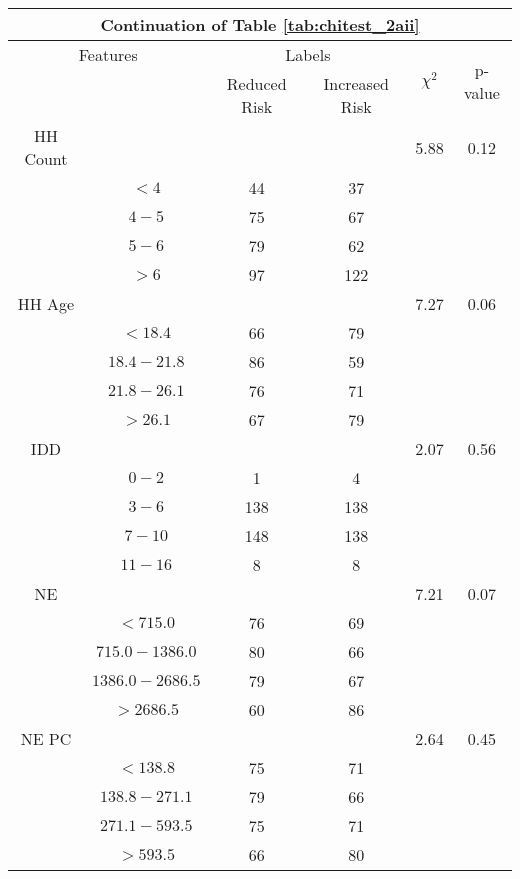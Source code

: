 \begin{table}
\centering
\label{tab:chitest_2aii_cont}
\begin{tabular}{c c | c c| c | c}
\hline
\multicolumn{6}{c}{Continuation of Table \ref{tab:chitest_2aii}}\\ 
\hline
\multicolumn{2}{c|}{Features}& \multicolumn{2}{c|}{Labels}& \multirow{2}{*}{$\chi^2$} & \multirow{2}{*}{p-value}\\ 
& & Reduced Risk & Increased Risk & & \\ 
\hline
HH Count &  &  & & 5.88 & 0.12 \\ 
& $< 4$ & 44 & 37& & \\ 
& $4-5$ & 75 & 67& & \\ 
& $5-6$ & 79 & 62& & \\ 
& $> 6$ & 97 & 122& & \\ 
\hline 
HH Age &  &  & & 7.27 & 0.06 \\ 
& $< 18.4$ & 66 & 79& & \\ 
& $18.4-21.8$ & 86 & 59& & \\ 
& $21.8-26.1$ & 76 & 71& & \\ 
& $> 26.1$ & 67 & 79& & \\ 
\hline 
IDD &  &  & & 2.07 & 0.56 \\ 
& $0-2$ & 1 & 4& & \\ 
& $3-6$ & 138 & 138& & \\ 
& $7-10$ & 148 & 138& & \\ 
& $11-16$ & 8 & 8& & \\ 
\hline 
NE &  &  & & 7.21 & 0.07 \\ 
& $< 715.0$ & 76 & 69& & \\ 
& $715.0-1386.0$ & 80 & 66& & \\ 
& $1386.0-2686.5$ & 79 & 67& & \\ 
& $> 2686.5$ & 60 & 86& & \\ 
\hline 
NE PC &  &  & & 2.64 & 0.45 \\ 
& $< 138.8$ & 75 & 71& & \\ 
& $138.8-271.1$ & 79 & 66& & \\ 
& $271.1-593.5$ & 75 & 71& & \\ 
& $> 593.5$ & 66 & 80& & \\ 
\hline 
\end{tabular}
\end{table}

